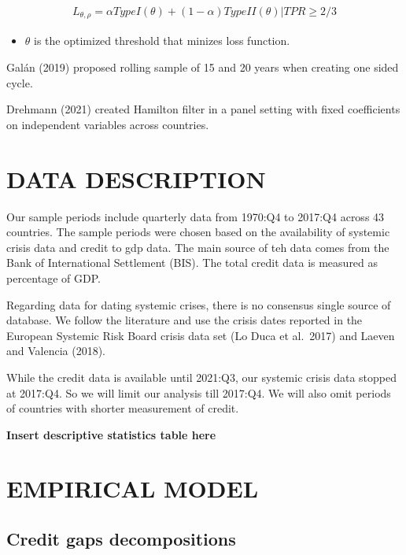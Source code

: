 \documentclass[
  12pt,
]{article}
\providecommand{\tightlist}{%
  \setlength{\itemsep}{0pt}\setlength{\parskip}{0pt}}
\begin{document}
\begin{align*}
L_{\theta,\rho}=\alpha TypeI(\theta)+(1-\alpha)TypeII(\theta)|TPR\ge2/3
\end{align*}

\begin{itemize}
\tightlist
\item
  \(\theta\) is the optimized threshold that minizes loss function.
\end{itemize}

Galán (2019) proposed rolling sample of 15 and 20 years when creating one sided cycle.

Drehmann (2021) created Hamilton filter in a panel setting with fixed coefficients on independent variables across countries.

\hypertarget{data-description}{%
\section{DATA DESCRIPTION}\label{data-description}}

Our sample periods include quarterly data from 1970:Q4 to 2017:Q4 across 43 countries. The sample periods were chosen
based on the availability of systemic crisis data and credit to gdp data. The main source of teh data
comes from the Bank of International Settlement (BIS). The total credit data is measured as percentage of GDP.

Regarding data for dating systemic crises, there is no consensus single source of database. We follow the literature and
use the crisis dates reported in the European Systemic Risk Board crisis data set (Lo Duca et al.~2017) and
Laeven and Valencia (2018).

While the credit data is available until 2021:Q3, our systemic crisis data stopped at 2017:Q4. So we will limit our analysis
till 2017:Q4. We will also omit periods of countries with shorter measurement of credit.

\textbf{Insert descriptive statistics table here}

\hypertarget{empirical-model}{%
\section{EMPIRICAL MODEL}\label{empirical-model}}

\hypertarget{credit-gaps-decompositions}{%
\subsection{Credit gaps decompositions}\label{credit-gaps-decompositions}}
\end{document}
